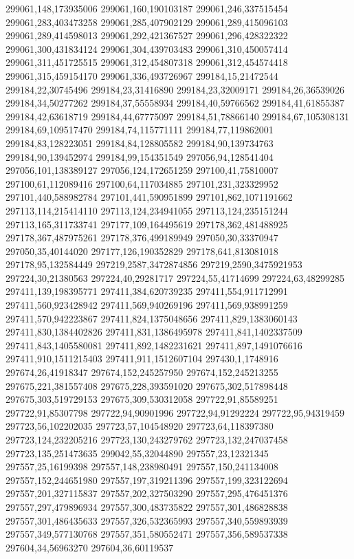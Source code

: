 299061,148,173935006
299061,160,190103187
299061,246,337515454
299061,283,403473258
299061,285,407902129
299061,289,415096103
299061,289,414598013
299061,292,421367527
299061,296,428322322
299061,300,431834124
299061,304,439703483
299061,310,450057414
299061,311,451725515
299061,312,454807318
299061,312,454574418
299061,315,459154170
299061,336,493726967
299184,15,21472544
299184,22,30745496
299184,23,31416890
299184,23,32009171
299184,26,36539026
299184,34,50277262
299184,37,55558934
299184,40,59766562
299184,41,61855387
299184,42,63618719
299184,44,67775097
299184,51,78866140
299184,67,105308131
299184,69,109517470
299184,74,115771111
299184,77,119862001
299184,83,128223051
299184,84,128805582
299184,90,139734763
299184,90,139452974
299184,99,154351549
297056,94,128541404
297056,101,138389127
297056,124,172651259
297100,41,75810007
297100,61,112089416
297100,64,117034885
297101,231,323329952
297101,440,588982784
297101,441,590951899
297101,862,1071191662
297113,114,215414110
297113,124,234941055
297113,124,235151244
297113,165,311733741
297177,109,164495619
297178,362,481488925
297178,367,487975261
297178,376,499189949
297050,30,33370947
297050,35,40144020
297177,126,190352829
297178,641,813081018
297178,95,132584449
297219,2587,3472874856
297219,2590,3475921953
297224,30,21380563
297224,40,29281717
297224,55,41714699
297224,63,48299285
297411,139,198395771
297411,384,620739235
297411,554,911712991
297411,560,923428942
297411,569,940269196
297411,569,938991259
297411,570,942223867
297411,824,1375048656
297411,829,1383060143
297411,830,1384402826
297411,831,1386495978
297411,841,1402337509
297411,843,1405580081
297411,892,1482231621
297411,897,1491076616
297411,910,1511215403
297411,911,1512607104
297430,1,1748916
297674,26,41918347
297674,152,245257950
297674,152,245213255
297675,221,381557408
297675,228,393591020
297675,302,517898448
297675,303,519729153
297675,309,530312058
297722,91,85589251
297722,91,85307798
297722,94,90901996
297722,94,91292224
297722,95,94319459
297723,56,102202035
297723,57,104548920
297723,64,118397380
297723,124,232205216
297723,130,243279762
297723,132,247037458
297723,135,251473635
299042,55,32044890
297557,23,12321345
297557,25,16199398
297557,148,238980491
297557,150,241134008
297557,152,244651980
297557,197,319211396
297557,199,323122694
297557,201,327115837
297557,202,327503290
297557,295,476451376
297557,297,479896934
297557,300,483735822
297557,301,486828838
297557,301,486435633
297557,326,532365993
297557,340,559893939
297557,349,577130768
297557,351,580552471
297557,356,589537338
297604,34,56963270
297604,36,60119537
